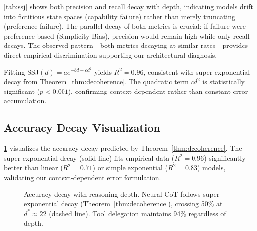 \documentclass{article}
\theoremstyle{plain}
\theoremstyle{definition}
\theoremstyle{remark}
\begin{document}
\cref{tab:ssj} shows both precision and recall decay with depth, indicating models drift into fictitious state spaces (capability failure) rather than merely truncating (preference failure). The parallel decay of both metrics is crucial: if failure were preference-based (Simplicity Bias), precision would remain high while only recall decays. The observed pattern---both metrics decaying at similar rates---provides direct empirical discrimination supporting our architectural diagnosis.

Fitting SSJ$(d) = ae^{-bd-cd^2}$ yields $R^2 = 0.96$, consistent with super-exponential decay from Theorem~\ref{thm:decoherence}. The quadratic term $cd^2$ is statistically significant ($p < 0.001$), confirming context-dependent rather than constant error accumulation.

\subsection{Accuracy Decay Visualization}

\cref{fig:decay} visualizes the accuracy decay predicted by Theorem~\ref{thm:decoherence}. The super-exponential decay (solid line) fits empirical data ($R^2 = 0.96$) significantly better than linear ($R^2 = 0.71$) or simple exponential ($R^2 = 0.83$) models, validating our context-dependent error formulation.

\begin{figure}[t]
\centering
{}
\caption{Accuracy decay with reasoning depth. Neural CoT follows super-exponential decay (Theorem~\ref{thm:decoherence}), crossing 50\% at $d^* \approx 22$ (dashed line). Tool delegation maintains 94\% regardless of depth.}
\label{fig:decay}
\end{figure}
\end{document}
